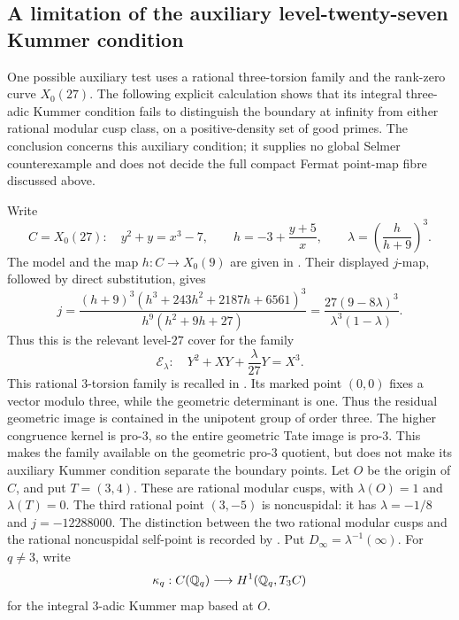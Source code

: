 \subsection{A limitation of the auxiliary level-twenty-seven Kummer condition}
\label{subsec:auxiliary-level27-kummer}

One possible auxiliary test uses a rational three-torsion family
and the rank-zero curve \(X_0(27)\). The following explicit
calculation shows that its integral three-adic Kummer condition
fails to distinguish the boundary at infinity from either rational
modular cusp class, on a positive-density set of good primes.
The conclusion concerns this auxiliary condition; it supplies no
global Selmer counterexample and does not decide the full compact
Fermat point-map fibre discussed above.

Write
\[
 C=X_0(27):\quad y^2+y=x^3-7,\qquad
 h=-3+\frac{y+5}{x},\qquad
 \lambda=\left(\frac{h}{h+9}\right)^3.
\]
The model and the map \(h:C\to X_0(9)\) are given in
\cite[proof of Proposition 24, p.~18 of the 2020 author version]{BourdonGillRouseWatson2024}.
Their displayed \(j\)-map, followed by direct substitution, gives
\[
 j=\frac{(h+9)^3(h^3+243h^2+2187h+6561)^3}
          {h^9(h^2+9h+27)}
   =\frac{27(9-8\lambda)^3}{\lambda^3(1-\lambda)}.
\]
Thus this is the relevant level-\(27\) cover for the family
\[
 \mathcal E_\lambda:\quad
 Y^2+XY+\frac{\lambda}{27}Y=X^3.
\]
This rational \(3\)-torsion family is recalled in
\cite[\S2.3, (2.3.3) and Lemma 2.3.5, p.~7]{FreiHonigsVoight2025}.
Its marked point \((0,0)\) fixes a vector modulo three, while the
geometric determinant is one. Thus the residual geometric image
is contained in the unipotent group of order three. The higher
congruence kernel is pro-\(3\), so the entire geometric Tate image
is pro-\(3\). This makes the family available on the geometric
pro-\(3\) quotient, but does not make its auxiliary Kummer condition
separate the boundary points.
Let \(O\) be the origin of \(C\), and put \(T=(3,4)\).
These are rational modular cusps, with \(\lambda(O)=1\) and
\(\lambda(T)=0\). The third rational point \((3,-5)\) is
noncuspidal: it has \(\lambda=-1/8\) and \(j=-12288000\).
The distinction between the two rational modular cusps and the
rational noncuspidal self-point is recorded by
\citet[\S6.2, p.~17 of the 17 March 2008 author version]{WuthrichSelfPoints2009}.
Put \(D_\infty=\lambda^{-1}(\infty)\).
For \(q\ne3\), write
\[
 \kappa_q:C(\mathbb Q_q)\longrightarrow H^1(\mathbb Q_q,T_3C)
\]
for the integral \(3\)-adic Kummer map based at \(O\).

